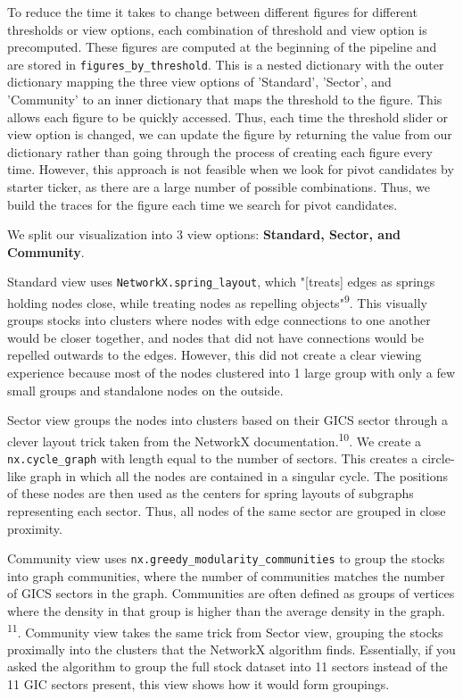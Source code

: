 \documentclass[fontsize=11pt]{article}
\begin{document}
To reduce the time it takes to change between different figures for different thresholds or view options, each combination of threshold and view option is precomputed. These figures are computed at the beginning of the pipeline and are stored in \texttt{figures\_by\_threshold}. This is a nested dictionary with the outer dictionary mapping the three view options of 'Standard', 'Sector', and 'Community' to an inner dictionary that maps the threshold to the figure. This allows each figure to be quickly accessed. Thus, each time the threshold slider or view option is changed, we can update the figure by returning the value from our dictionary rather than going through the process of creating each figure every time. However, this approach is not feasible when we look for pivot candidates by starter ticker, as there are a large number of possible combinations. Thus, we build the traces for the figure each time we search for pivot candidates.


We split our visualization into 3 view options: \textbf{Standard, Sector, and Community}.

Standard view uses \texttt{NetworkX.spring\_layout}, which "[treats] edges as springs holding nodes close, while treating nodes as repelling objects"\textsuperscript{9}. This visually groups stocks into clusters where nodes with edge connections to one another would be closer together, and nodes that did not have connections would be repelled outwards to the edges. However, this did not create a clear viewing experience because most of the nodes clustered into 1 large group with only a few small groups and standalone nodes on the outside.

Sector view groups the nodes into clusters based on their GICS sector through a clever layout trick taken from the NetworkX documentation.\textsuperscript{10}. We create a \texttt{nx.cycle\_graph} with length equal to the number of sectors. This creates a circle-like graph in which all the nodes are contained in a singular cycle. The positions of these nodes are then used as the centers for spring layouts of subgraphs representing each sector. Thus, all nodes of the same sector are grouped in close proximity.

Community view uses \texttt{nx.greedy\_modularity\_communities} to group the stocks into graph communities, where the number of communities matches the number of GICS sectors in the graph. Communities are often defined as groups of vertices where the density in that group is higher than the average density in the graph. \textsuperscript{11}. Community view takes the same trick from Sector view, grouping the stocks proximally into the clusters that the NetworkX algorithm finds. Essentially, if you asked the algorithm to group the full stock dataset into 11 sectors instead of the 11 GIC sectors present, this view shows how it would form groupings. \\
\end{document}
